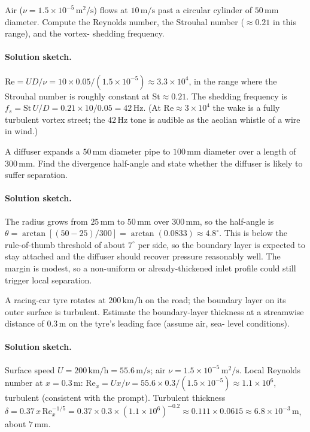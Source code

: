 \begin{exercise}
Air ($\nu = 1.5\times 10^{-5}\,\si{\meter}^2/\si{\second}$) flows at
$10\,\si{\meter\per\second}$ past a circular cylinder of
$50\,\si{\milli\meter}$ diameter. Compute the Reynolds number, the
Strouhal number ($\approx 0.21$ in this range), and the vortex-
shedding frequency.

\paragraph{Solution sketch.} $\text{Re} = UD/\nu = 10\times0.05/
(1.5\times10^{-5}) \approx 3.3\times10^{4}$, in the range where the
Strouhal number is roughly constant at $\text{St}\approx0.21$. The
shedding frequency is $f_s = \text{St}\,U/D = 0.21\times10/0.05 =
42\,\si{\hertz}$. (At $\text{Re}\approx3\times10^4$ the wake is a
fully turbulent vortex street; the $42\,\si{\hertz}$ tone is audible
as the aeolian whistle of a wire in wind.)
\end{exercise}

\begin{exercise}
A diffuser expands a $50\,\si{\milli\meter}$ diameter pipe to
$100\,\si{\milli\meter}$ diameter over a length of $300\,\si{\milli
\meter}$. Find the divergence half-angle and state whether the
diffuser is likely to suffer separation.

\paragraph{Solution sketch.} The radius grows from $25\,\si{\milli
\meter}$ to $50\,\si{\milli\meter}$ over $300\,\si{\milli\meter}$,
so the half-angle is $\theta = \arctan[(50-25)/300] = \arctan(0.0833)
\approx 4.8^{\circ}$. This is below the rule-of-thumb threshold of
about $7^{\circ}$ per side, so the boundary layer is expected to stay
attached and the diffuser should recover pressure reasonably well.
The margin is modest, so a non-uniform or already-thickened inlet
profile could still trigger local separation.
\end{exercise}

\begin{exercise}
A racing-car tyre rotates at $200\,\text{km/h}$ on
the road; the boundary layer on its outer surface is turbulent.
Estimate the boundary-layer thickness at a streamwise distance of
$0.3\,\si{\meter}$ on the tyre's leading face (assume air, sea-
level conditions).

\paragraph{Solution sketch.} Surface speed $U = 200\,\text{km/h} =
55.6\,\si{\meter\per\second}$; air $\nu = 1.5\times10^{-5}\,\si{
\meter}^2/\si{\second}$. Local Reynolds number at $x = 0.3\,\si{
\meter}$: $\text{Re}_x = Ux/\nu = 55.6\times0.3/(1.5\times10^{-5})
\approx 1.1\times10^{6}$, turbulent (consistent with the prompt).
Turbulent thickness $\delta = 0.37\,x\,\text{Re}_x^{-1/5} = 0.37
\times0.3\times(1.1\times10^6)^{-0.2} \approx 0.111\times0.0615
\approx 6.8\times10^{-3}\,\si{\meter}$, about $7\,\si{\milli\meter}$.
\end{exercise}

